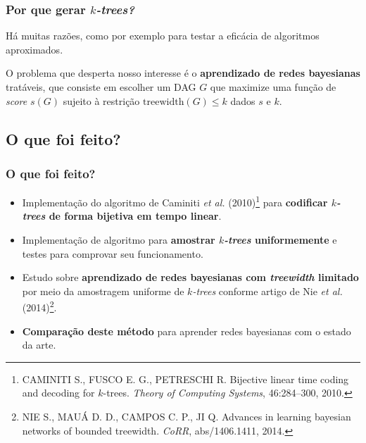 \documentclass{beamer}
\begin{document}
  \begin{frame}
    \frametitle{Por que gerar \emph{$k$-trees?}}

    Há muitas razões, como por exemplo para testar a eficácia de algoritmos aproximados.

    \vspace{1em}

    O problema que desperta nosso interesse é o \textbf{aprendizado de redes bayesianas} tratáveis, que consiste em escolher um DAG $G$ que maximize uma função de \emph{score} $s(G)$ sujeito à restrição $\text{treewidth}(G) \leq k$ dados $s$ e $k$.
  \end{frame}

  \subsection{O que foi feito?}

  \begin{frame}
    \frametitle{O que foi feito?}

    \begin{itemize}
      \item Implementação do algoritmo de Caminiti \emph{et al.} (2010)\footnote{\scriptsize CAMINITI S., FUSCO E. G., PETRESCHI R. Bijective linear time coding and decoding for $k$-trees. \emph{Theory of Computing Systems}, 46:284--300, 2010.} para \textbf{codificar \emph{$k$-trees} de forma bijetiva em tempo linear}.
      \item Implementação de algoritmo para \textbf{amostrar \emph{$k$-trees} uniformemente} e testes para comprovar seu funcionamento.
      \item Estudo sobre \textbf{aprendizado de redes bayesianas com \emph{treewidth} limitado} por meio da amostragem uniforme de \emph{$k$-trees} conforme artigo de Nie \emph{et al.} (2014)\footnote{\scriptsize NIE S., MAUÁ D. D., CAMPOS C. P., JI Q. Advances in learning bayesian networks of bounded treewidth. \emph{CoRR}, abs/1406.1411, 2014.}.
      \item \textbf{Comparação deste método} para aprender redes bayesianas com o estado da arte.
    \end{itemize}
  \end{frame}

%
%
\end{document}
